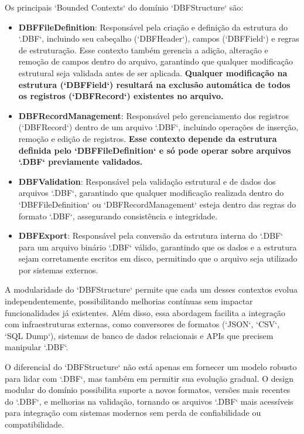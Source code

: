 \begin{titlepage}
    Os principais `Bounded Contexts` do domínio `DBFStructure` são:

    \begin{itemize}
        \item \textbf{DBFFileDefinition}: Responsável pela criação e definição da estrutura do `.DBF`, incluindo seu cabeçalho (`DBFHeader`), campos (`DBFField`) e regras de estruturação. Esse contexto também gerencia a adição, alteração e remoção de campos dentro do arquivo, garantindo que qualquer modificação estrutural seja validada antes de ser aplicada. \textbf{Qualquer modificação na estrutura (`DBFField`) resultará na exclusão automática de todos os registros (`DBFRecord`) existentes no arquivo.}

        \item \textbf{DBFRecordManagement}: Responsável pelo gerenciamento dos registros (`DBFRecord`) dentro de um arquivo `.DBF`, incluindo operações de inserção, remoção e edição de registros. \textbf{Esse contexto depende da estrutura definida pelo `DBFFileDefinition` e só pode operar sobre arquivos `.DBF` previamente validados.}

        \item \textbf{DBFValidation}: Responsável pela validação estrutural e de dados dos arquivos `.DBF`, garantindo que qualquer modificação realizada dentro do `DBFFileDefinition` ou `DBFRecordManagement` esteja dentro das regras do formato `.DBF`, assegurando consistência e integridade.

        \item \textbf{DBFExport}: Responsável pela conversão da estrutura interna do `.DBF` para um arquivo binário `.DBF` válido, garantindo que os dados e a estrutura sejam corretamente escritos em disco, permitindo que o arquivo seja utilizado por sistemas externos.
    \end{itemize}

    A modularidade do `DBFStructure` permite que cada um desses contextos evolua
    independentemente, possibilitando melhorias contínuas sem impactar
    funcionalidades já existentes. Além disso, essa abordagem facilita a integração
    com infraestruturas externas, como conversores de formatos (`JSON`, `CSV`, `SQL
    Dump`), sistemas de banco de dados relacionais e APIs que precisem manipular
    `.DBF`.

    O diferencial do `DBFStructure` não está apenas em fornecer um modelo robusto
    para lidar com `.DBF`, mas também em permitir sua evolução gradual. O design
    modular do domínio possibilita suporte a novos formatos, versões mais recentes
    do `.DBF`, e melhorias na validação, tornando os arquivos `.DBF` mais
    acessíveis para integração com sistemas modernos sem perda de confiabilidade ou
    compatibilidade.


\end{titlepage}
